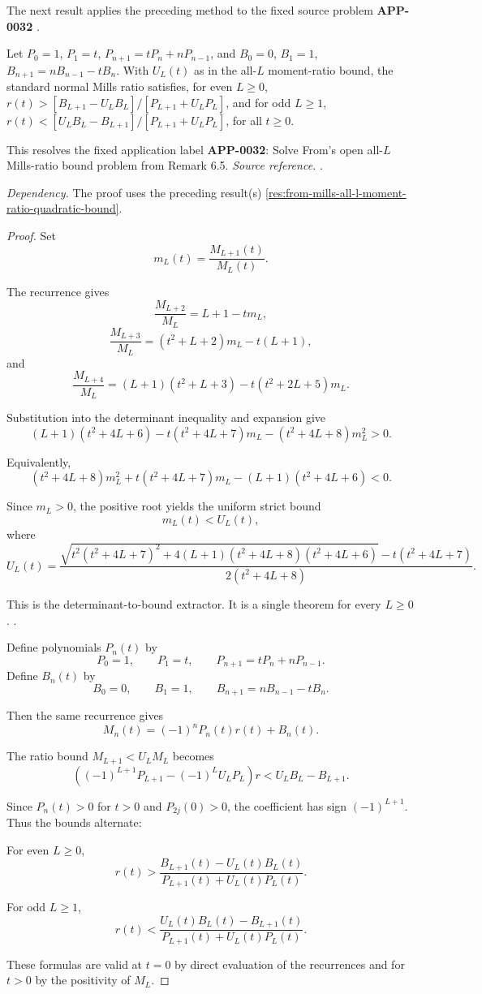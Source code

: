 The next result applies the preceding method to the fixed source problem \textbf{APP-0032} \cite{from-mills}.
\begin{corollary}
\label{res:from-mills-all-l-alternating-r-bound-family}
Let \(P_0=1\), \(P_1=t\), \(P_{n+1}=tP_n+nP_{n-1}\), and \(B_0=0\), \(B_1=1\), \(B_{n+1}=nB_{n-1}-tB_n\). With \(U_L(t)\) as in the all-\(L\) moment-ratio bound, the standard normal Mills ratio satisfies, for even \(L\ge0\), \(r(t)>[B_{L+1}-U_LB_L]/[P_{L+1}+U_LP_L]\), and for odd \(L\ge1\), \(r(t)<[U_LB_L-B_{L+1}]/[P_{L+1}+U_LP_L]\), for all \(t\ge0\).

This resolves the fixed application label \textbf{APP-0032}: Solve From's open all-\(L\) Mills-ratio bound problem from Remark 6.5.
\emph{Source reference.} \cite{from-mills}.

\emph{Dependency.} The proof uses the preceding result(s) \ref{res:from-mills-all-l-moment-ratio-quadratic-bound}.
\end{corollary}
\begin{proof}
Set
\[
m_L(t)=\frac{M_{L+1}(t)}{M_L(t)}.
\]

The recurrence gives
\[
\frac{M_{L+2}}{M_L}=L+1-tm_L,
\]
\[
\frac{M_{L+3}}{M_L}=(t^2+L+2)m_L-t(L+1),
\]
and
\[
\frac{M_{L+4}}{M_L}=(L+1)(t^2+L+3)-t(t^2+2L+5)m_L.
\]

Substitution into the determinant inequality and expansion give
\[
(L+1)(t^2+4L+6)-t(t^2+4L+7)m_L-(t^2+4L+8)m_L^2>0.
\]

Equivalently,
\[
(t^2+4L+8)m_L^2+t(t^2+4L+7)m_L-(L+1)(t^2+4L+6)<0.
\]

Since \(m_L>0\), the positive root yields the uniform strict bound
\[
m_L(t)<U_L(t),
\]
where
\[
U_L(t)=
\frac{
\sqrt{t^2(t^2+4L+7)^2+4(L+1)(t^2+4L+8)(t^2+4L+6)}
-t(t^2+4L+7)
}
{2(t^2+4L+8)}.
\]

This is the determinant-to-bound extractor. It is a single theorem for every \(L\ge0\). \cite{from-mills}.

Define polynomials \(P_n(t)\) by
\[
P_0=1,\qquad P_1=t,\qquad P_{n+1}=tP_n+nP_{n-1}.
\]
Define \(B_n(t)\) by
\[
B_0=0,\qquad B_1=1,\qquad B_{n+1}=nB_{n-1}-tB_n.
\]

Then the same recurrence gives
\[
M_n(t)=(-1)^nP_n(t)r(t)+B_n(t).
\]

The ratio bound \(M_{L+1}<U_LM_L\) becomes
\[
\left((-1)^{L+1}P_{L+1}-(-1)^L U_LP_L\right)r
<U_LB_L-B_{L+1}.
\]

Since \(P_n(t)>0\) for \(t>0\) and \(P_{2j}(0)>0\), the coefficient has sign \((-1)^{L+1}\). Thus the bounds alternate:

For even \(L\ge0\),
\[
r(t)>
\frac{B_{L+1}(t)-U_L(t)B_L(t)}
{P_{L+1}(t)+U_L(t)P_L(t)}.
\]

For odd \(L\ge1\),
\[
r(t)<
\frac{U_L(t)B_L(t)-B_{L+1}(t)}
{P_{L+1}(t)+U_L(t)P_L(t)}.
\]

These formulas are valid at \(t=0\) by direct evaluation of the recurrences and for \(t>0\) by the positivity of \(M_L\).
\end{proof}

